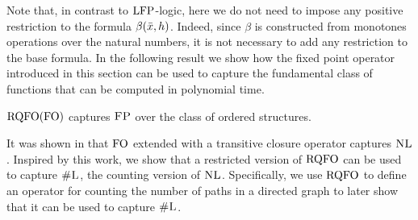 Note that, in contrast to ${\rm LFP}$-logic, here we do not need to impose any positive restriction to the formula $\beta(\bar{x},h)$.
Indeed, since $\beta$ is constructed from monotones operations over the natural numbers, it is not necessary to add any restriction to the base formula.
In the following result we show how the fixed point operator introduced in this section can be used to capture the fundamental class of functions that can be computed in polynomial time.
\begin{theorem} \label{rqfo-fo-cap}
	${\rm RQFO}({\rm FO})$ captures $\text{\sc FP}$ over the class of ordered structures.
\end{theorem}

%
%
%

It was shown in \cite{I86,I88} that ${\rm FO}$ extended with a transitive closure operator captures $\text{\sc NL}$. 
Inspired by this work, we show that a restricted version of ${\rm RQFO}$ can be used to capture $\text{\sc \#L}$, the counting version of $\text{\sc NL}$. 
Specifically, we use ${\rm RQFO}$ to define an operator for counting the number of paths in a directed graph to later show that it can be used to capture $\text{\sc \#L}$. 

